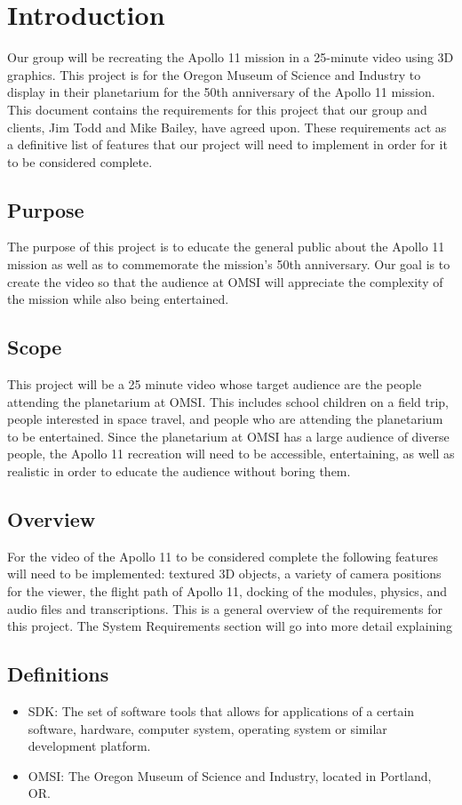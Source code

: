 \documentclass[onecolumn, draftclsnofoot,10pt, compsoc]{IEEEtran}
\begin{document}
\section{Introduction}
Our group will be recreating the Apollo 11 mission in a 25-minute video using 3D graphics. This project is for the Oregon Museum of Science and Industry to display in their planetarium for the 50th anniversary of the Apollo 11 mission. This document contains the requirements for this project that our group and clients, Jim Todd and Mike Bailey, have agreed upon. These requirements act as a definitive list of features that our project will need to implement in order for it to be considered complete. 
    \subsection{Purpose}
    The purpose of this project is to educate the general public about the Apollo 11 mission as well as to commemorate the mission's 50th anniversary. Our goal is to create the video so that the audience at OMSI will appreciate the complexity of the mission while also being entertained. 
    \subsection{Scope}
    This project will be a 25 minute video whose target audience are the people attending the planetarium at OMSI. This includes school children on a field trip, people interested in space travel, and people who are attending the planetarium to be entertained. Since the planetarium at OMSI has a large audience of diverse people, the Apollo 11 recreation will need to be accessible, entertaining, as well as realistic in order to educate the audience without boring them.
    \subsection{Overview}
    For the video of the Apollo 11 to be considered complete the following features will need to be implemented: textured 3D objects, a variety of camera positions for the viewer, the flight path of Apollo 11, docking of the modules, physics, and audio files and transcriptions. This is a general overview of the requirements for this project. The System Requirements section will go into more detail explaining  
    \subsection{Definitions}
    \begin{itemize}
        \item SDK: The set of software tools that allows for applications of a certain software, hardware, computer system, operating system or similar development platform.
        \item OMSI: The Oregon Museum of Science and Industry, located in Portland, OR.
    \end{itemize}
\end{document}

